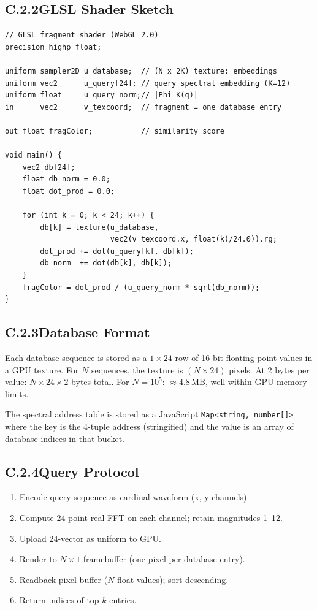 \subsection*{C.2.2\quad GLSL Shader Sketch}

\begin{verbatim}
// GLSL fragment shader (WebGL 2.0)
precision highp float;

uniform sampler2D u_database;  // (N x 2K) texture: embeddings
uniform vec2      u_query[24]; // query spectral embedding (K=12)
uniform float     u_query_norm;// |Phi_K(q)|
in      vec2      v_texcoord;  // fragment = one database entry

out float fragColor;           // similarity score

void main() {
    vec2 db[24];
    float db_norm = 0.0;
    float dot_prod = 0.0;

    for (int k = 0; k < 24; k++) {
        db[k] = texture(u_database,
                        vec2(v_texcoord.x, float(k)/24.0)).rg;
        dot_prod += dot(u_query[k], db[k]);
        db_norm  += dot(db[k], db[k]);
    }
    fragColor = dot_prod / (u_query_norm * sqrt(db_norm));
}
\end{verbatim}

\subsection*{C.2.3\quad Database Format}

Each database sequence is stored as a $1 \times 24$ row of 16-bit
floating-point values in a GPU texture. For $N$ sequences, the texture
is $(N \times 24)$ pixels. At 2 bytes per value: $N \times 24 \times 2$
bytes total. For $N = 10^5$: $\approx 4.8$\,MB, well within GPU memory limits.

The spectral address table is stored as a JavaScript \texttt{Map<string, number[]>}
where the key is the 4-tuple address (stringified) and the value is an array
of database indices in that bucket.

\subsection*{C.2.4\quad Query Protocol}

\begin{enumerate}
  \item Encode query sequence as cardinal waveform (x, y channels).
  \item Compute 24-point real FFT on each channel; retain magnitudes 1--12.
  \item Upload 24-vector as uniform to GPU.
  \item Render to $N \times 1$ framebuffer (one pixel per database entry).
  \item Readback pixel buffer ($N$ float values); sort descending.
  \item Return indices of top-$k$ entries.
\end{enumerate}

